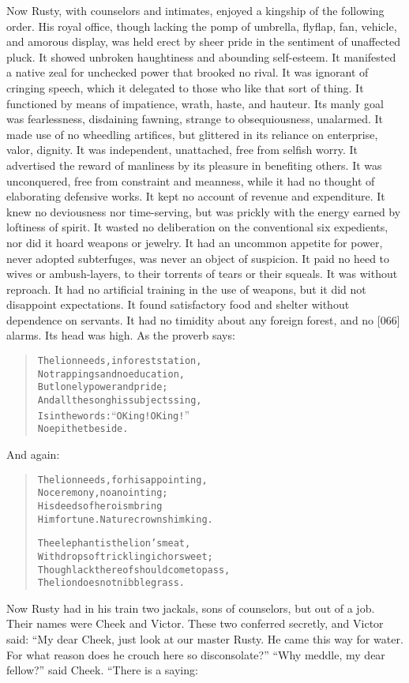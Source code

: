 \documentclass[article, twoside, 14pt]{memoir}
\renewenvironment{verbatim}{%
\begin{quote}%
\vskip -10pt%
\begin{alltt}\normalfont\large}{\end{alltt}%
\end{quote}%
\vskip -10pt
} %
\begin{document}
Now Rusty, with counselors and intimates, enjoyed a kingship of the
following order. His royal office, though lacking the pomp of
umbrella, flyflap, fan, vehicle, and amorous display, was held
erect by sheer pride in the sentiment of unaffected pluck. It
showed unbroken haughtiness and abounding self-esteem. It
manifested a native zeal for unchecked power that brooked no rival.
It was ignorant of cringing speech, which it delegated to those who
like that sort of thing. It functioned by means of impatience,
wrath, haste, and hauteur. Its manly goal was fearlessness,
disdaining fawning, strange to obsequiousness, unalarmed. It made
use of no wheedling artifices, but glittered in its reliance on
enterprise, valor, dignity. It was independent, unattached, free
from selfish worry. It advertised the reward of manliness by its
pleasure in benefiting others. It was unconquered, free from
constraint and meanness, while it had no thought of elaborating
defensive works. It kept no account of revenue and expenditure. It
knew no deviousness nor time-serving, but was prickly with the
energy earned by loftiness of spirit. It wasted no deliberation on
the conventional six expedients, nor did it hoard weapons or
jewelry. It had an uncommon appetite for power, never adopted
subterfuges, was never an object of suspicion. It paid no heed to
wives or ambush-layers, to their torrents of tears or their
squeals. It was without reproach. It had no artificial training in
the use of weapons, but it did not disappoint expectations. It
found satisfactory food and shelter without dependence on servants.
It had no timidity about any foreign forest, and no [066] alarms.
Its head was high. As the proverb says:

\begin{verbatim}
The lion needs, in forest station,
No trappings and no education,
    But lonely power and pride;
And all the song his subjects sing,
Is in the words: “O King! O King!”
    No epithet beside.
\end{verbatim}
And again:

\begin{verbatim}
The lion needs, for his appointing,
No ceremony, no anointing;
His deeds of heroism bring
Him fortune. Nature crowns him king.

The elephant is the lion's meat,
With drops of trickling ichor sweet;
Though lack thereof should come to pass,
The lion does not nibble grass.
\end{verbatim}
Now Rusty had in his train two jackals, sons of counselors, but out
of a job. Their names were Cheek and Victor. These two conferred
secretly, and Victor said:
``My dear Cheek, just look at our master Rusty. He came this way for water. For what reason does he crouch here so disconsolate?''
``Why meddle, my dear fellow?'' said Cheek. “There is a saying:
\end{document}
